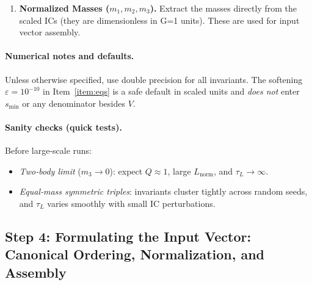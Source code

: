 \begin{enumerate}
\begin{lstlisting}
        if not divergence:
            return np.inf # Not enough points to calculate divergence

        # Linear regression to find the Lyapunov exponent
        time_steps = np.arange(len(divergence)) * dt
        coeffs = np.polyfit(time_steps, divergence, 1)
        lambda_max = coeffs[0]

        if lambda_max <= 0:
            return np.inf

        return 1.0 / lambda_max

    \end{lstlisting}





    \item \textbf{Normalized Masses ($m_1, m_2, m_3$).}
    Extract the masses directly from the scaled ICs (they are dimensionless in G=1 units). These are used for input vector assembly.

\end{enumerate}







\paragraph{Numerical notes and defaults.}
Unless otherwise specified, use double precision for all invariants. The softening
$\varepsilon=10^{-10}$ in Item~\ref{item:eqs} is a safe default in scaled units and
\emph{does not} enter $s_{\min}$ or any denominator besides $V$.

\paragraph{Sanity checks (quick tests).}
Before large‑scale runs:
\begin{itemize}
  \item \emph{Two‑body limit} ($m_3\!\to 0$): expect $Q\!\approx\!1$, large $L_{\mathrm{norm}}$,
        and $\tau_L\!\to\!\infty$.
  \item \emph{Equal‑mass symmetric triples}: invariants cluster tightly across random seeds,
        and $\tau_L$ varies smoothly with small IC perturbations.
\end{itemize}

\subsection{Step 4: Formulating the Input Vector: Canonical Ordering, Normalization, and Assembly}


